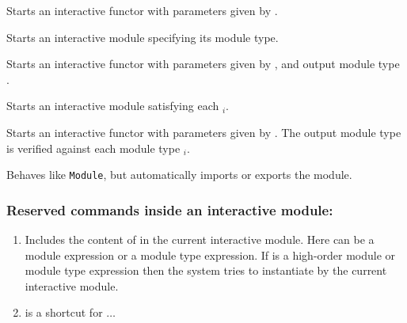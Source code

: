 \begin{Variants}

\item{}

  Starts an interactive functor with parameters given by {\modbindings}.

\item{}

  Starts an interactive module specifying its module type. 

\item{}

  Starts an interactive functor with parameters given by
  {\modbindings}, and output module type {\modtype}.

\item{}

  Starts an interactive module satisfying each {\modtype$_i$}. 

\item{}

  Starts an interactive functor with parameters given by
  {\modbindings}. The output module type is verified against each
  module type {\modtype$_i$}.

\item{}

  Behaves like \texttt{Module}, but automatically imports or exports
  the module.

\end{Variants}
\subsubsection{Reserved commands inside an interactive module:
}
\begin{enumerate}
\item {}

  Includes the content of {\module} in the current interactive
 module. Here {\module} can be a module expression or a module type
 expression. If {\module} is a high-order module or module type
 expression then the system tries to instantiate {\module}
 by the current interactive module.

\item {}

is a shortcut for {}  $\ldots$ {}
\end{enumerate}
